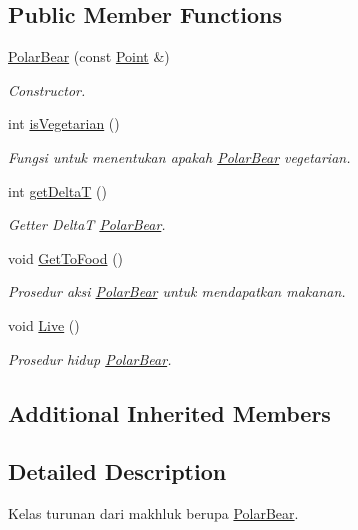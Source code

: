 \subsection*{Public Member Functions}
\begin{DoxyCompactItemize}
\item 
\hyperlink{class_polar_bear_ad6a4789bb79ea33f3f97e9e5e1b05810}{Polar\+Bear} (const \hyperlink{class_point}{Point} \&)
\begin{DoxyCompactList}\small\item\em Constructor. \end{DoxyCompactList}\item 
int \hyperlink{class_polar_bear_a528b34c3db1dee2cd5c06f6b6d221a14}{is\+Vegetarian} ()
\begin{DoxyCompactList}\small\item\em Fungsi untuk menentukan apakah \hyperlink{class_polar_bear}{Polar\+Bear} vegetarian. \end{DoxyCompactList}\item 
int \hyperlink{class_polar_bear_a636383dd8f5c357f205642a8b0354a55}{get\+DeltaT} ()
\begin{DoxyCompactList}\small\item\em Getter DeltaT \hyperlink{class_polar_bear}{Polar\+Bear}. \end{DoxyCompactList}\item 
void \hyperlink{class_polar_bear_a4b2f0d6aab60ceba83a1ced4c305ed3f}{Get\+To\+Food} ()
\begin{DoxyCompactList}\small\item\em Prosedur aksi \hyperlink{class_polar_bear}{Polar\+Bear} untuk mendapatkan makanan. \end{DoxyCompactList}\item 
void \hyperlink{class_polar_bear_aecb4f132a925275d4e730b58fc79158b}{Live} ()
\begin{DoxyCompactList}\small\item\em Prosedur hidup \hyperlink{class_polar_bear}{Polar\+Bear}. \end{DoxyCompactList}\end{DoxyCompactItemize}
\subsection*{Additional Inherited Members}


\subsection{Detailed Description}
Kelas turunan dari makhluk berupa \hyperlink{class_polar_bear}{Polar\+Bear}. 

